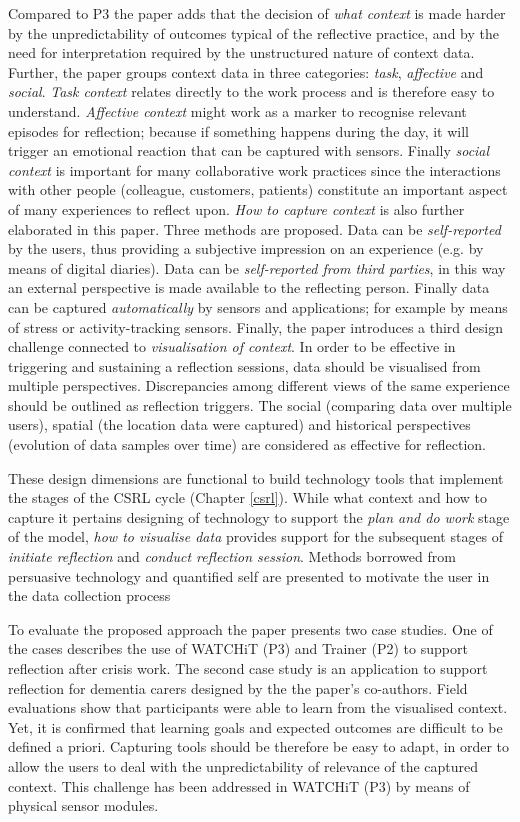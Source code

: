 Compared to P3 the paper adds that the decision of \emph{what context} is made harder by the unpredictability of outcomes typical of the reflective practice, and by the need for interpretation required by the unstructured nature of context data. Further, the paper groups context data in three categories: \emph{task}, \emph{affective} and \emph{social}. \emph{Task context} relates directly to the work process and is therefore easy to understand. \emph{Affective context} might work as a marker to recognise relevant episodes for reflection; because if something happens during the day, it will trigger an emotional reaction that can be captured with sensors. Finally \emph{social context} is important for many collaborative work practices since the interactions with other people (colleague, customers, patients) constitute an important aspect of many experiences to reflect upon. \emph{How to capture context} is also further elaborated in this paper. Three methods are proposed. Data can be \emph{self-reported} by the users, thus providing a subjective impression on an experience (e.g. by means of digital diaries). Data can be \emph{self-reported from third parties}, in this way an external perspective is made available to the reflecting person. Finally data can be captured \emph{automatically} by sensors and applications; for example by means of stress or activity-tracking sensors. Finally, the paper introduces a third design challenge connected to \emph{visualisation of context}. In order to be effective in triggering and sustaining a reflection sessions, data should be visualised from multiple perspectives. Discrepancies among different views of the same experience should be outlined as reflection triggers. The social (comparing data over multiple users), spatial (the location data were captured) and historical perspectives (evolution of data samples over time) are considered as effective for reflection. 

These design dimensions are functional to build technology tools that implement the stages of the CSRL cycle (Chapter \ref{csrl}). While what context and how to capture it pertains designing of technology to support the \emph{plan and do work} stage of the model, \emph{how to visualise data} provides support for the subsequent stages of \emph{initiate reflection} and \emph{conduct reflection session}. Methods borrowed from persuasive technology and quantified self are presented to motivate the user in the data collection process

To evaluate the proposed approach the paper presents two case studies. One of the cases describes the use of WATCHiT (P3) and Trainer (P2) to support reflection after crisis work. The second case study is an application to support reflection for dementia carers designed by the the paper's co-authors. Field evaluations show that participants were able to learn from the visualised context. Yet, it is confirmed that learning goals and expected outcomes are difficult to be defined a priori. Capturing tools should be therefore be easy to adapt, in order to allow the users to deal with the unpredictability of relevance of the captured context. This challenge has been addressed in WATCHiT (P3) by means of physical sensor modules.

